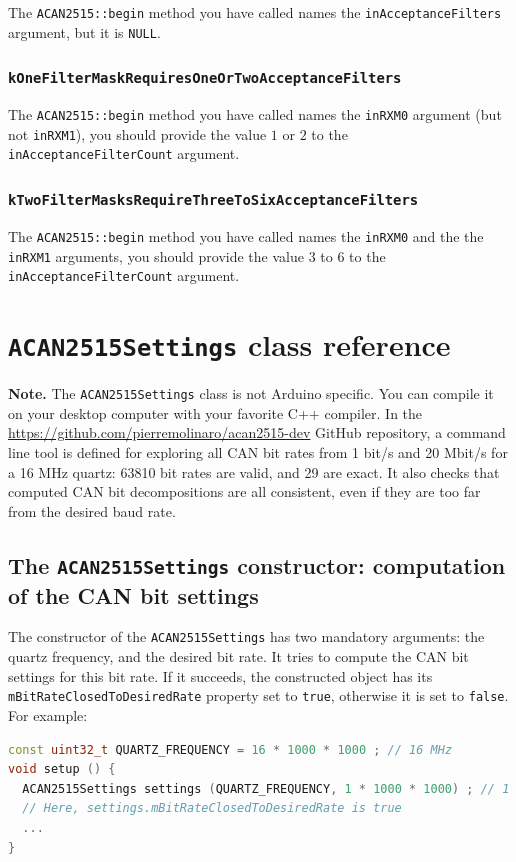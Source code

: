 \documentclass[10pt, a4paper, obeyspaces, openany]{extarticle}
\newcommand \sectionLabel[2]{\section{#1}\label{sec:#2}}
\newcommand \subsectionLabel[2]{\subsection{#1}\label{subsec:#2}}
\newcommand \subsubsectionLabel[2]{\subsubsection{#1}\label{subsubsec:#2}}
\begin{document}
The \texttt{ACAN2515::begin} method you have called names the \texttt{inAcceptanceFilters} argument, but it is \texttt{NULL}.






\subsubsectionLabel{\texttt{kOneFilterMaskRequiresOneOrTwoAcceptanceFilters}}{kOneFilterMaskRequiresOneOrTwoAcceptanceFilters}

The \texttt{ACAN2515::begin} method you have called names the \texttt{inRXM0} argument (but not \texttt{inRXM1}), you should provide the value $1$ or $2$ to the \texttt{inAcceptanceFilterCount} argument.







\subsubsectionLabel{\texttt{kTwoFilterMasksRequireThreeToSixAcceptanceFilters}}{kTwoFilterMasksRequireThreeToSixAcceptanceFilters}

The \texttt{ACAN2515::begin} method you have called names the \texttt{inRXM0} and the the \texttt{inRXM1} arguments, you should provide the value $3$ to $6$ to the \texttt{inAcceptanceFilterCount} argument.














\sectionLabel{\texttt{ACAN2515Settings} class reference}{ACAN2515SettingsRef}

{\bf Note. } The \texttt{ACAN2515Settings} class is not Arduino specific. You can compile it on your desktop computer with your favorite C++ compiler. In the \url{https://github.com/pierremolinaro/acan2515-dev} GitHub repository, a command line tool is defined for exploring all CAN bit rates from 1 bit/s and 20 Mbit/s for a 16 MHz quartz: 63810 bit rates are valid, and 29 are exact. It also checks that computed CAN bit decompositions are all consistent, even if they are too far from the desired baud rate.



\subsectionLabel{The \texttt{ACAN2515Settings} constructor: computation of the CAN bit settings}{CANbitSettings}

The constructor of the \texttt{ACAN2515Settings} has two mandatory arguments: the quartz frequency, and the desired bit rate. It tries to compute the CAN bit settings for this bit rate. If it succeeds, the constructed object has its \texttt{mBitRateClosedToDesiredRate} property set to \texttt{true}, otherwise it is set to \texttt{false}. For example:
{ \small\begin{lstlisting}[language=c++]
const uint32_t QUARTZ_FREQUENCY = 16 * 1000 * 1000 ; // 16 MHz
void setup () {
  ACAN2515Settings settings (QUARTZ_FREQUENCY, 1 * 1000 * 1000) ; // 1 Mbit/s
  // Here, settings.mBitRateClosedToDesiredRate is true
  ...
}
\end{lstlisting}}
\end{document}

